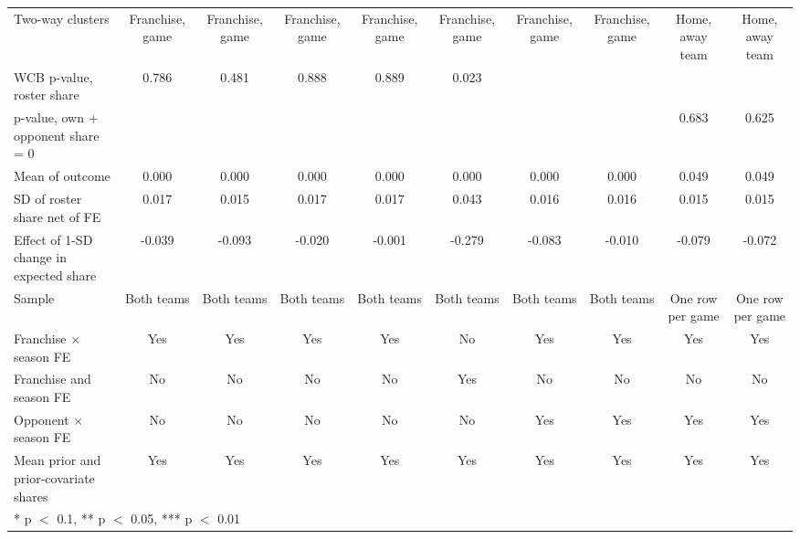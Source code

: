 \begin{table}[H]
{\begin{tabular}[t]{lccccccccc}
Two-way clusters & Franchise, game & Franchise, game & Franchise, game & Franchise, game & Franchise, game & Franchise, game & Franchise, game & Home, away team & Home, away team\\
WCB p-value, roster share & 0.786 & 0.481 & 0.888 & 0.889 & 0.023 &  &  &  & \\
p-value, own + opponent share = 0 &  &  &  &  &  &  &  & 0.683 & 0.625\\
Mean of outcome & 0.000 & 0.000 & 0.000 & 0.000 & 0.000 & 0.000 & 0.000 & 0.049 & 0.049\\
SD of roster share net of FE & 0.017 & 0.015 & 0.017 & 0.017 & 0.043 & 0.016 & 0.016 & 0.015 & 0.015\\
Effect of 1-SD change in expected share & -0.039 & -0.093 & -0.020 & -0.001 & -0.279 & -0.083 & -0.010 & -0.079 & -0.072\\
Sample & Both teams & Both teams & Both teams & Both teams & Both teams & Both teams & Both teams & One row per game & One row per game\\
Franchise $\times$ season FE & Yes & Yes & Yes & Yes & No & Yes & Yes & Yes & Yes\\
Franchise and season FE & No & No & No & No & Yes & No & No & No & No\\
Opponent $\times$ season FE & No & No & No & No & No & Yes & Yes & Yes & Yes\\
Mean prior and prior-covariate shares & Yes & Yes & Yes & Yes & Yes & Yes & Yes & Yes & Yes\\
\bottomrule
\multicolumn{10}{l}{\rule{0pt}{1em}* p $<$ 0.1, ** p $<$ 0.05, *** p $<$ 0.01}\\
\end{tabular}}
\end{table}

